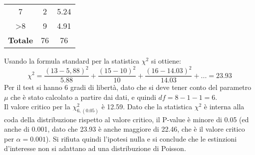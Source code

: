 \documentclass[drafts, 10pt]{book}
\newcounter{example}[section]
\begin{document}
\begin{example}
\begin{table}[H]
\begin{tabular}{c|c|c}
        7 & 2 & 5.24 \\
        >8 & 9&4.91 \\
        \hline
        \textbf{Totale} & 76 & 76\\
        \hline
        \end{tabular}
        \caption{}
        \label{tabestinzioni2}
\end{table}\noindent
Usando la formula standard per la statistica $\chi^2$ si ottiene:
\begin{equation}
\chi^2 = \frac{(13-5,88)^2}{5.88}+\frac{(15-10)^2}{10}+\frac{(16-14.03)^2}{14.03}+... = 23.93
\end{equation}
Per il test si hanno 6 gradi di libertà, dato che si deve tener conto del parametro $\mu$ che è stato calcolato a partire dai dati, e quindi $df = 8-1-1=6$.
\\
Il valore critico per la $\chi^2_{6,(0.05)}$ è 12.59. Dato che la statistica $\chi^2$ è interna alla coda della distribuzione rispetto al valore critico, il P-value è minore di 0.05 (ed anche di 0.001, dato che 23.93 è anche maggiore di 22.46, che è il valore critico per $\alpha = 0.001$). Si rifiuta quindi l'ipotesi nulla e si conclude che le estinzioni d'interesse non si adattano ad una distribuzione di Poisson.
\end{example}

\end{document}
